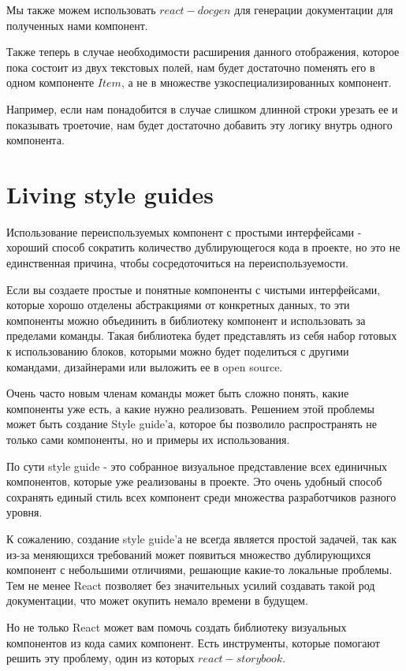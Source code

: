 Мы также можем использовать $react-docgen$ для генерации документации для полученных нами компонент.

Также теперь в случае необходимости расширения данного отображения, которое пока состоит из двух текстовых полей, нам будет достаточно поменять его в одном компоненте $Item$, а не в множестве узкоспециализированных компонент.

Например, если нам понадобится в случае слишком длинной строки урезать ее и показывать троеточие, нам будет достаточно добавить эту логику внутрь одного компонента.

\section{Living style guides}

Использование переиспользуемых компонент с простыми интерфейсами - хороший способ сократить количество дублирующегося кода в проекте, но это не единственная причина, чтобы сосредоточиться на переиспользуемости.

Если вы создаете простые и понятные компоненты с чистыми интерфейсами, которые хорошо отделены абстракциями от конкретных данных, то эти компоненты можно объединить в библиотеку компонент и использовать за пределами команды. Такая библиотека будет представлять из себя набор готовых к использованию блоков, которыми можно будет поделиться с другими командами, дизайнерами или выложить ее в open source.

Очень часто новым членам команды может быть сложно понять, какие компоненты уже есть, а какие нужно реализовать. Решением этой проблемы может быть создание Style guide'а, которое бы позволило распространять не только сами компоненты, но и примеры их использования.

По сути style guide - это собранное визуальное представление всех единичных компонентов, которые уже реализованы в проекте. Это очень удобный способ сохранять единый стиль всех компонент среди множества разработчиков разного уровня. 

К сожалению, создание style guide'а не всегда является простой задачей, так как из-за меняющихся требований может появиться множество дублирующихся компонент с небольшими отличиями, решающие какие-то локальные проблемы. Тем не менее React позволяет без значительных усилий создавать такой род документации, что может окупить немало времени в будущем.

Но не только React может вам помочь создать библиотеку визуальных компонентов из кода самих компонент. Есть инструменты, которые помогают решить эту проблему, один из которых $react-storybook$.


